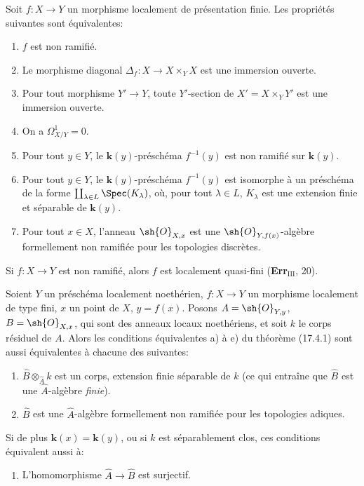 \begin{corollary}[17.4.2]
\label{IV.17.4.2}
Soit $f:X\to Y$ un morphisme localement de présentation finie. Les propriétés suivantes sont équivalentes:
\begin{enumerate}
  \item[\textup{a)}] $f$ est non ramifié.
  \item[\textup{b)}] Le morphisme diagonal $\Delta_f:X\to X\times_Y X$ est une immersion ouverte.
  \item[\textup{b$'$)}] Pour tout morphisme $Y'\to Y$, toute $Y'$-section de $X'=X\times_Y Y'$ est une immersion ouverte.
  \item[\textup{c)}] On a $\varOmega^1_{X/Y}=0$.
  \item[\textup{d)}] Pour tout $y\in Y$, le $\boldsymbol{k}(y)$-préschéma $f^{-1}(y)$ est non ramifié sur $\boldsymbol{k}(y)$.
  \item[\textup{d$'$)}] Pour tout $y\in Y$, le $\boldsymbol{k}(y)$-préschéma $f^{-1}(y)$ est isomorphe à un préschéma de la forme $\coprod_{\lambda\in L}\Spec(K_\lambda)$, où, pour tout $\lambda\in L$, $K_\lambda$ est une extension finie et séparable de $\boldsymbol{k}(y)$.
  \item[\textup{e)}] Pour tout $x\in X$, l'anneau $\sh{O}_{X,x}$ est une $\sh{O}_{Y,f(x)}$-algèbre formellement non ramifiée pour les topologies discrètes.
\end{enumerate}
\end{corollary}

\begin{corollary}[17.4.3]
\label{IV.17.4.3}
Si $f:X\to Y$ est non ramifié, alors $f$ est localement quasi-fini \textup{(\textbf{Err}$_{\mathrm{III}}$, 20)}.
\end{corollary}

\begin{proposition}[17.4.4]
\label{IV.17.4.4}
Soient $Y$ un préschéma \textup{localement noethérien}, $f:X\to Y$ un morphisme localement de type fini, $x$ un point de $X$, $y=f(x)$. Posons $A=\sh{O}_{Y,y}$, $B=\sh{O}_{X,x}$, qui sont des anneaux locaux noethériens, et soit $k$ le corps résiduel de $A$. Alors les conditions équivalentes \textup{a)} à \textup{e)} du théorème \textup{(17.4.1)} sont aussi équivalentes à chacune des suivantes:
\begin{enumerate}
  \item[\textup{f)}] $\widehat{B}\otimes_{\widehat{A}}k$ est un corps, extension finie séparable de $k$ \textup{(ce qui entraîne que $\widehat{B}$ est une $\widehat{A}$-algèbre \emph{finie})}.
  \item[\textup{f$'$)}] $\widehat{B}$ est une $\widehat{A}$-algèbre formellement non ramifiée pour les topologies adiques.
\end{enumerate}
Si de plus $\boldsymbol{k}(x)=\boldsymbol{k}(y)$, ou si $k$ est séparablement clos, ces conditions équivalent aussi à:
\begin{enumerate}
  \item[\textup{f$''$)}] L'homomorphisme $\widehat{A}\to\widehat{B}$ est surjectif.
\end{enumerate}
\end{proposition}

